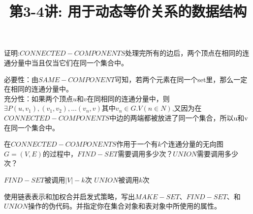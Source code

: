 \documentclass[a4paper, justified]{tufte-handout}
\title{第3-4讲: 用于动态等价关系的数据结构}
\date{\zhtoday} %
\begin{document}
\maketitle
\noplagiarism %
\begin{abstract}
\end{abstract}
\beginrequired

\begin{problem}[TC 21.1-2]
证明:$CONNECTED-COMPONENTS$处理完所有的边后，两个顶点在相同的连通分量中当且仅当它们在同一个集合中。
\end{problem}

\begin{solution}
  必要性：由$SAME-COMPONENT$可知，若两个元素在同一个set里，那么一定在相同的连通分量中。\\
  充分性：如果两个顶点$u$和$v$在同相同的连通分量中，则$\exists P{(u, v_1), (v_1, v_2),...(v_n, v)}$其中$v_n \in G.V (n\in N)$,又因为在$CONNECTED-COMPONENTS$中边的两端都被放进了同一个集合，所以u和v在同一个集合中。
\end{solution}

\begin{problem}[TC 21.1-3]
在$CONNECTED-COMPONENTS$作用于一个有$k$个连通分量的无向图$G=(V,E)$的过程中，$FIND-SET$需要调用多少次？$UNION$需要调用多少次？
\end{problem}

\begin{solution}
  $FIND-SET$被调用$|V|-k$次
  $UNION$被调用$k$次
\end{solution}

\begin{problem}[TC 21.2-1]
使用链表表示和加权合并启发式策略，写出$MAKE-SET$、$FIND-SET$、和$UNION$操作的伪代码。并指定你在集合对象和表对象中所使用的属性。
\end{problem}
\end{document}
